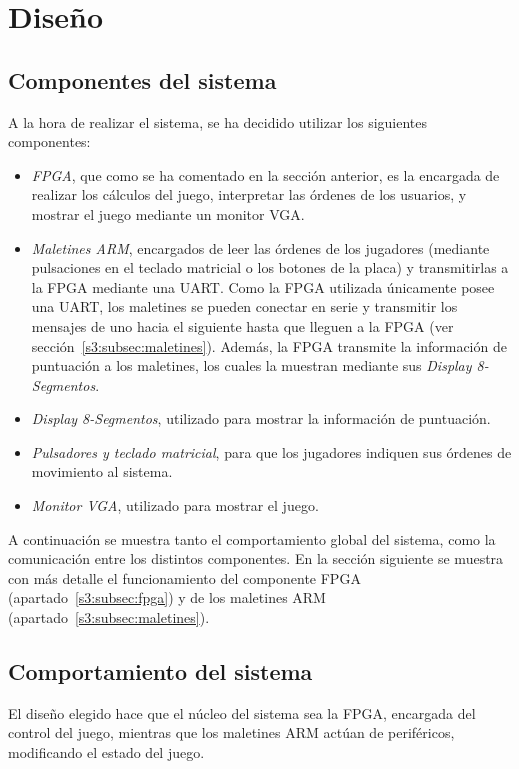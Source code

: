 \section{Diseño}
\label{s2:sec:Disenyo}

\subsection{Componentes del sistema}
\label{s2:subsec:sistema-entero}
A la hora de realizar el sistema, se ha decidido utilizar los siguientes
componentes:
\begin{itemize}
\item \emph{FPGA}, que como se ha comentado en la sección anterior, es la
  encargada de realizar los cálculos del juego, interpretar las órdenes de
  los usuarios, y mostrar el juego mediante un monitor VGA.
\item \emph{Maletines ARM}, encargados de leer las órdenes de los
  jugadores (mediante pulsaciones en el teclado matricial o los botones de
  la placa) y transmitirlas a la FPGA mediante una UART. Como la FPGA
  utilizada únicamente posee una UART, los maletines se pueden conectar en
  serie y transmitir los mensajes de uno hacia el siguiente hasta que
  lleguen a la FPGA (ver sección~\ref{s3:subsec:maletines}). Además, la
  FPGA transmite la información de puntuación a los maletines, los cuales
  la muestran mediante sus \emph{Display 8-Segmentos}.
\item \emph{Display 8-Segmentos}, utilizado para mostrar la información de
  puntuación.
\item \emph{Pulsadores y teclado matricial}, para que los jugadores
  indiquen sus órdenes de movimiento al sistema.
\item \emph{Monitor VGA}, utilizado para mostrar el juego.
\end{itemize}

A continuación se muestra tanto el comportamiento global del sistema, como
la comunicación entre los distintos componentes. En la sección siguiente
se muestra con más detalle el funcionamiento del componente FPGA
(apartado~\ref{s3:subsec:fpga}) y de los maletines ARM
(apartado~\ref{s3:subsec:maletines}).

\subsection{Comportamiento del sistema}
\label{s2:subsec:comportamiento}
El diseño elegido hace que el núcleo del sistema sea la FPGA, encargada del
control del juego, mientras que los maletines ARM actúan de periféricos,
modificando el estado del juego.

